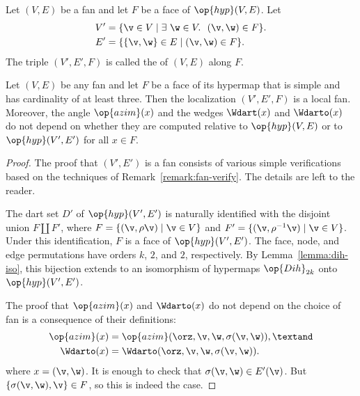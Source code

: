 \begin{definition}[localization]
 Let $(V,E)$ be a fan and let $F$ be
a face of $\op{hyp}(V,E)$.  Let
\begin{align*}
V' &= \{\v\in V \mid \exists~\w\in V.~~(\v,\w)\in F\}.\\
E' &= \{\{\v,\w\} \in E\mid (\v,\w)\in F\}.
\end{align*}
The triple $(V',E',F)$ is called the  of $(V,E)$ along $F$.
\end{definition}
%


\begin{lemma}[localization]%
\label{lemma:localization}
Let $(V,E)$ be any fan and let $F$ be a face of its hypermap that is
simple and has cardinality of at least three.  Then the localization
$(V',E',F)$ is a local fan.  Moreover, the angle $\op{azim}(x)$ and
the wedges $\Wdart(x)$ and $\Wdarto(x)$ do not depend on whether they
are computed relative to $\op{hyp}(V,E)$ or to $\op{hyp}(V',E')$ for
all $x\in F$.
\end{lemma}



\begin{proof}
The proof that $(V',E')$ is a fan consists of various simple
verifications based on the techniques of
Remark~\ref{remark:fan-verify}.  The details are left to the reader.

The dart set $D'$ of $\op{hyp}(V',E')$ is naturally identified with
the disjoint union $F\coprod F'$, where $F = \{(\v,\rho\v) \mid \v\in
V\}$ and $F'=\{(\v,\rho^{-1}\v) \mid \v\in V\}$.  Under this
identification, $F$ is a face of $\op{hyp}(V',E')$.  The face, node,
and edge permutations have orders $k$, $2$, and $2$, respectively.  By
Lemma~\ref{lemma:dih-iso}, this bijection extends to an isomorphism of
hypermaps $\op{Dih}_{2k}$ onto $\op{hyp}(V',E')$.

The proof that  $\op{azim}(x)$ and $\Wdarto(x)$ do not depend on the
choice of fan is a consequence of their definitions:
\begin{align*}
\op{azim}(x) &= \op{azim}(\orz,\v,\w,\sigma(\v,\w)),\textand \\
\Wdarto(x) &= \Wdarto(\orz,\v,\w,\sigma(\v,\w)).\\
\end{align*}
where $x = (\v,\w)$.  It is enough to check that $\sigma(\v,\w)\in
E'(\v)$.  But $\{\sigma(\v,\w),\v\}\in F$, so this is indeed the case.
\end{proof}

